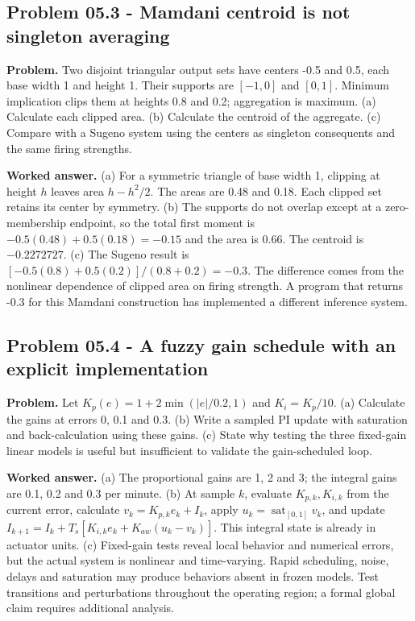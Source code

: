 \documentclass[11pt,a4paper]{article}
\begin{document}
\subsection{Problem 05.3 - Mamdani centroid is not singleton averaging}
\textbf{Problem.} Two disjoint triangular output sets have centers -0.5 and 0.5, each base width 1 and height 1. Their supports are $[-1,0]$ and $[0,1]$. Minimum implication clips them at heights 0.8 and 0.2; aggregation is maximum. (a) Calculate each clipped area. (b) Calculate the centroid of the aggregate. (c) Compare with a Sugeno system using the centers as singleton consequents and the same firing strengths.


\textbf{Worked answer.} (a) For a symmetric triangle of base width 1, clipping at height $h$ leaves area $h-h^2/2$. The areas are 0.48 and 0.18. Each clipped set retains its center by symmetry. (b) The supports do not overlap except at a zero-membership endpoint, so the total first moment is $-0.5(0.48)+0.5(0.18)=-0.15$ and the area is 0.66. The centroid is $-0.2272727$. (c) The Sugeno result is $[-0.5(0.8)+0.5(0.2)]/(0.8+0.2)=-0.3$. The difference comes from the nonlinear dependence of clipped area on firing strength. A program that returns -0.3 for this Mamdani construction has implemented a different inference system.

\subsection{Problem 05.4 - A fuzzy gain schedule with an explicit implementation}
\textbf{Problem.} Let $K_p(e)=1+2\min(|e|/0.2,1)$ and $K_i=K_p/10$. (a) Calculate the gains at errors 0, 0.1 and 0.3. (b) Write a sampled PI update with saturation and back-calculation using these gains. (c) State why testing the three fixed-gain linear models is useful but insufficient to validate the gain-scheduled loop.


\textbf{Worked answer.} (a) The proportional gains are 1, 2 and 3; the integral gains are 0.1, 0.2 and 0.3 per minute. (b) At sample $k$, evaluate $K_{p,k},K_{i,k}$ from the current error, calculate $v_k=K_{p,k}e_k+I_k$, apply $u_k=\operatorname{sat}_{[0,1]}v_k$, and update $I_{k+1}=I_k+T_s[K_{i,k}e_k+K_{aw}(u_k-v_k)]$. This integral state is already in actuator units. (c) Fixed-gain tests reveal local behavior and numerical errors, but the actual system is nonlinear and time-varying. Rapid scheduling, noise, delays and saturation may produce behaviors absent in frozen models. Test transitions and perturbations throughout the operating region; a formal global claim requires additional analysis.
\end{document}
